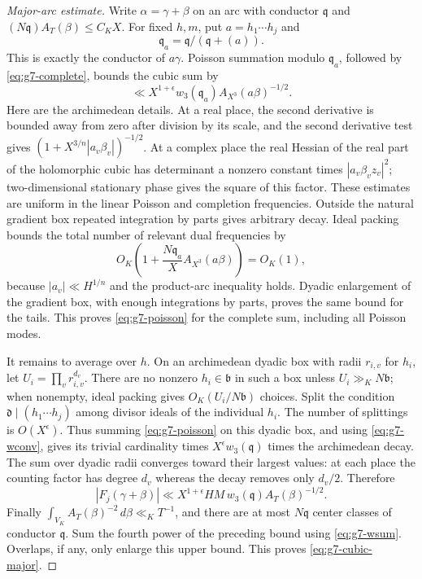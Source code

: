 \documentclass[11pt,reqno]{amsart}
\numberwithin{equation}{section}
\theoremstyle{definition}
\begin{document}
\begin{proof}[Major-arc estimate]
Write $\alpha=\gamma+\beta$ on an arc with conductor $\mathfrak q$ and
$(N\mathfrak q)A_T(\beta)\le C_KX$.
For fixed $h,m$, put $a=h_1\cdots h_j$ and
\[
 \mathfrak q_a=\mathfrak q/(\mathfrak q+(a)).
\]
This is exactly the conductor of $a\gamma$.
Poisson summation modulo $\mathfrak q_a$, followed by
\eqref{eq:g7-complete}, bounds the cubic sum by
\begin{equation}\label{eq:g7-poisson}
 \ll X^{1+\epsilon}w_3(\mathfrak q_a)
       A_{X^3}(a\beta)^{-1/2}.
\end{equation}
Here are the archimedean details.  At a real place, the second derivative is
bounded away from zero after division by its scale, and the second derivative
test gives $(1+X^{3/n}|a_v\beta_v|)^{-1/2}$.
At a complex place the real Hessian of the real part of the holomorphic cubic
has determinant a nonzero constant times $|a_v\beta_v z_v|^2$;
two-dimensional stationary phase gives the square of this factor.
These estimates are uniform in the linear Poisson and completion frequencies.
Outside the natural gradient box repeated integration by parts gives arbitrary
decay.  Ideal packing bounds the total number of relevant dual frequencies by
\[
 O_K\left(1+\frac{N\mathfrak q_a}{X}A_{X^3}(a\beta)\right)=O_K(1),
\]
because $|a_v|\ll H^{1/n}$ and the product-arc inequality holds.
Dyadic enlargement of the gradient box, with enough integrations by parts,
proves the same bound for the tails.  This proves \eqref{eq:g7-poisson} for
the complete sum, including all Poisson modes.

It remains to average over $h$.  On an archimedean dyadic box with radii
$r_{i,v}$ for $h_i$, let $U_i=\prod_v r_{i,v}^{d_v}$.
There are no nonzero $h_i\in\mathfrak b$ in such a box unless
$U_i\gg_KN\mathfrak b$; when nonempty, ideal packing gives
$O_K(U_i/N\mathfrak b)$ choices.
Split the condition $\mathfrak d\mid(h_1\cdots h_j)$ among divisor ideals
of the individual $h_i$.  The number of splittings is $O(X^\epsilon)$.
Thus summing \eqref{eq:g7-poisson} on this dyadic box, and using
\eqref{eq:g7-wconv}, gives its trivial cardinality times
$X^\epsilon w_3(\mathfrak q)$ times the archimedean decay.
The sum over dyadic radii converges toward their largest values: at each
place the counting factor has degree $d_v$ whereas the decay removes only
$d_v/2$.  Therefore
\[
 |F_j(\gamma+\beta)|
 \ll X^{1+\epsilon}HM\,w_3(\mathfrak q) A_T(\beta)^{-1/2}.
\]
Finally $\int_{V_K}A_T(\beta)^{-2}\,d\beta\ll_KT^{-1}$,
and there are at most $N\mathfrak q$ center classes of conductor
$\mathfrak q$.  Sum the fourth power of the preceding bound using
\eqref{eq:g7-wsum}.  Overlaps, if any, only enlarge this upper bound.
This proves \eqref{eq:g7-cubic-major}.
\end{proof}
\end{document}
